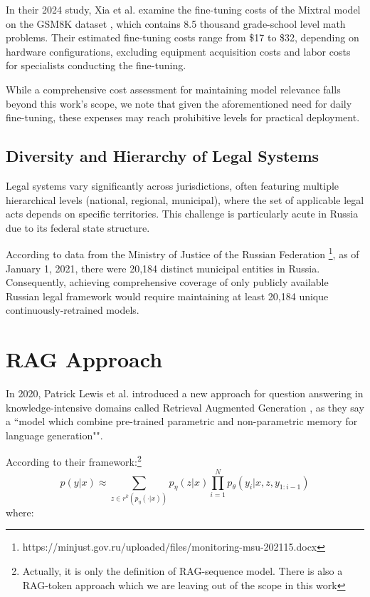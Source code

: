 In their 2024 study, Xia et al.\cite{xiaUnderstandingPerformanceEstimating2024} 
examine the fine-tuning costs of the Mixtral model \cite{jiangMixtralExperts2024} 
on the GSM8K dataset \cite{cobbeTrainingVerifiersSolve2021}, 
which contains 8.5 thousand grade-school level math problems. 
Their estimated fine-tuning costs range from \$17 to \$32, 
depending on hardware configurations, excluding equipment acquisition costs and 
labor costs for specialists conducting the fine-tuning.

While a comprehensive cost assessment for maintaining model relevance falls beyond this work's scope, we note that given the aforementioned need for daily fine-tuning, these expenses may reach prohibitive levels for practical deployment.

\subsection{Diversity and Hierarchy of Legal Systems}

Legal systems vary significantly across jurisdictions, 
often featuring multiple hierarchical levels (national, regional, municipal), 
where the set of applicable legal acts depends on specific territories. 
This challenge is particularly acute in Russia due to its federal state structure.

According to data from the Ministry of Justice of the Russian Federation \footnote{https://minjust.gov.ru/uploaded/files/monitoring-msu-202115.docx}, 
as of January 1, 2021, there were 20,184 distinct municipal entities in Russia. 
Consequently, achieving comprehensive coverage of only publicly available Russian legal framework
would require maintaining at least 20,184 unique continuously-retrained models.

\section{RAG Approach}
In 2020, Patrick Lewis et al. introduced a new approach for question answering in
 knowledge-intensive domains called Retrieval Augmented Generation 
 \cite{lewisRetrievalAugmentedGenerationKnowledgeIntensive2020}, 
 as they say a ``model which combine pre-trained parametric and 
 non-parametric memory for language generation"".

According to their framework:\footnote{
    Actually, it is only the definition of RAG-sequence model. There is also a RAG-token approach which
    we are leaving out of the scope in this work
}
\label{eq:rag_equation}
$$
p(y|x) \approx \sum_{z \in r^k(p_\eta(\cdot | x))} p_\eta(z|x) \prod_{i = 1}^{N}p_\theta(y_i | x, z, y_{1:i - 1})
$$
where:


